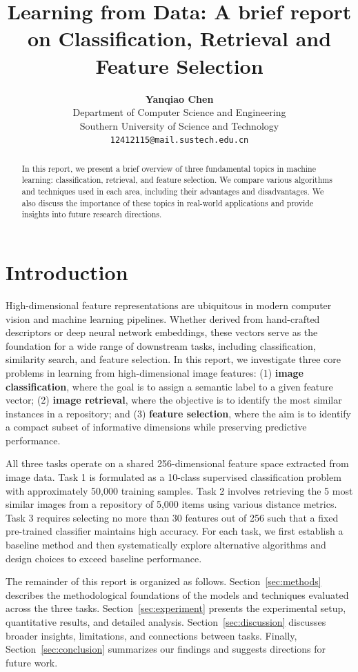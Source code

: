 \documentclass[onecolumn,a4paper,12pt]{IEEEtran}
\title{\textbf{Learning from Data: A brief report on Classification, Retrieval and Feature Selection}}
\author{\textbf{Yanqiao Chen}\\
        Department of Computer Science and Engineering\\
        Southern University of Science and Technology\\
        \texttt{12412115@mail.sustech.edu.cn}}
\begin{document}
\maketitle

\begin{abstract}
In this report, we present a brief overview of three fundamental topics in machine learning: classification, retrieval, and feature selection. We compare various algorithms and techniques used in each area, including their advantages and disadvantages. We also discuss the importance of these topics in real-world applications and provide insights into future research directions.
\end{abstract}

\section{Introduction}

High-dimensional feature representations are ubiquitous in modern computer vision and machine learning pipelines. Whether derived from hand-crafted descriptors or deep neural network embeddings, these vectors serve as the foundation for a wide range of downstream tasks, including classification, similarity search, and feature selection. In this report, we investigate three core problems in learning from high-dimensional image features: (1) \textbf{image classification}, where the goal is to assign a semantic label to a given feature vector; (2) \textbf{image retrieval}, where the objective is to identify the most similar instances in a repository; and (3) \textbf{feature selection}, where the aim is to identify a compact subset of informative dimensions while preserving predictive performance.

All three tasks operate on a shared 256-dimensional feature space extracted from image data. Task 1 is formulated as a 10-class supervised classification problem with approximately 50,000 training samples. Task 2 involves retrieving the 5 most similar images from a repository of 5,000 items using various distance metrics. Task 3 requires selecting no more than 30 features out of 256 such that a fixed pre-trained classifier maintains high accuracy. For each task, we first establish a baseline method and then systematically explore alternative algorithms and design choices to exceed baseline performance.

The remainder of this report is organized as follows. Section~\ref{sec:methods} describes the methodological foundations of the models and techniques evaluated across the three tasks. Section~\ref{sec:experiment} presents the experimental setup, quantitative results, and detailed analysis. Section~\ref{sec:discussion} discusses broader insights, limitations, and connections between tasks. Finally, Section~\ref{sec:conclusion} summarizes our findings and suggests directions for future work.
\end{document}
